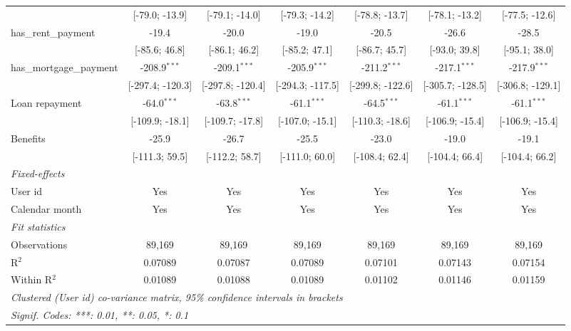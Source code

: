 \begin{table}[htbp]
\begin{threeparttable}[b]
\begin{tabular}{lcccccc}
                                   & [-79.0; -13.9]   & [-79.1; -14.0]   & [-79.3; -14.2]   & [-78.8; -13.7]   & [-78.1; -13.2]   & [-77.5; -12.6]\\   
         has\_rent\_payment        & -19.4            & -20.0            & -19.0            & -20.5            & -26.6            & -28.5\\   
                                   & [-85.6; 46.8]    & [-86.1; 46.2]    & [-85.2; 47.1]    & [-86.7; 45.7]    & [-93.0; 39.8]    & [-95.1; 38.0]\\   
         has\_mortgage\_payment    & -208.9$^{***}$   & -209.1$^{***}$   & -205.9$^{***}$   & -211.2$^{***}$   & -217.1$^{***}$   & -217.9$^{***}$\\   
                                   & [-297.4; -120.3] & [-297.8; -120.4] & [-294.3; -117.5] & [-299.8; -122.6] & [-305.7; -128.5] & [-306.8; -129.1]\\   
         Loan repayment            & -64.0$^{***}$    & -63.8$^{***}$    & -61.1$^{***}$    & -64.5$^{***}$    & -61.1$^{***}$    & -61.1$^{***}$\\   
                                   & [-109.9; -18.1]  & [-109.7; -17.8]  & [-107.0; -15.1]  & [-110.3; -18.6]  & [-106.9; -15.4]  & [-106.9; -15.4]\\   
         Benefits                  & -25.9            & -26.7            & -25.5            & -23.0            & -19.0            & -19.1\\   
                                   & [-111.3; 59.5]   & [-112.2; 58.7]   & [-111.0; 60.0]   & [-108.4; 62.4]   & [-104.4; 66.4]   & [-104.4; 66.2]\\   
         \midrule
         \emph{Fixed-effects}\\
         User id                   & Yes              & Yes              & Yes              & Yes              & Yes              & Yes\\  
         Calendar month            & Yes              & Yes              & Yes              & Yes              & Yes              & Yes\\  
         \midrule
         \emph{Fit statistics}\\
         Observations              & 89,169           & 89,169           & 89,169           & 89,169           & 89,169           & 89,169\\  
         R$^2$                     & 0.07089          & 0.07087          & 0.07089          & 0.07101          & 0.07143          & 0.07154\\  
         Within R$^2$              & 0.01089          & 0.01088          & 0.01089          & 0.01102          & 0.01146          & 0.01159\\  
         \midrule \midrule
         \multicolumn{7}{l}{\emph{Clustered (User id) co-variance matrix, 95\% confidence intervals in brackets}}\\
         \multicolumn{7}{l}{\emph{Signif. Codes: ***: 0.01, **: 0.05, *: 0.1}}\\
      \end{tabular}
      

\end{threeparttable}
\end{table}
